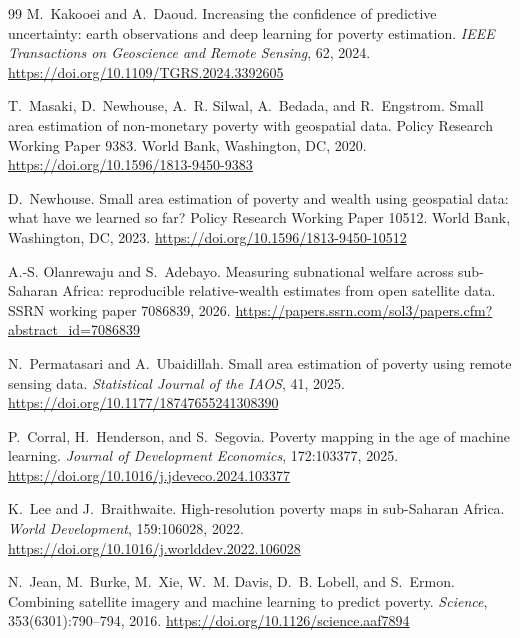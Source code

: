 \documentclass[11pt]{article}
\begin{document}
\begin{thebibliography}{99}
M.~Kakooei and A.~Daoud.
\newblock Increasing the confidence of predictive uncertainty: earth
observations and deep learning for poverty estimation.
\newblock \emph{IEEE Transactions on Geoscience and Remote Sensing}, 62, 2024.
\newblock \url{https://doi.org/10.1109/TGRS.2024.3392605}

T.~Masaki, D.~Newhouse, A.~R. Silwal, A.~Bedada, and R.~Engstrom.
\newblock Small area estimation of non-monetary poverty with geospatial data.
\newblock Policy Research Working Paper 9383. World Bank, Washington, DC, 2020.
\newblock \url{https://doi.org/10.1596/1813-9450-9383}

D.~Newhouse.
\newblock Small area estimation of poverty and wealth using geospatial data:
what have we learned so far?
\newblock Policy Research Working Paper 10512. World Bank, Washington, DC, 2023.
\newblock \url{https://doi.org/10.1596/1813-9450-10512}

A.-S. Olanrewaju and S.~Adebayo.
\newblock Measuring subnational welfare across sub-Saharan Africa: reproducible
relative-wealth estimates from open satellite data.
\newblock SSRN working paper 7086839, 2026.
\newblock \url{https://papers.ssrn.com/sol3/papers.cfm?abstract_id=7086839}

N.~Permatasari and A.~Ubaidillah.
\newblock Small area estimation of poverty using remote sensing data.
\newblock \emph{Statistical Journal of the IAOS}, 41, 2025.
\newblock \url{https://doi.org/10.1177/18747655241308390}

P.~Corral, H.~Henderson, and S.~Segovia.
\newblock Poverty mapping in the age of machine learning.
\newblock \emph{Journal of Development Economics}, 172:103377, 2025.
\newblock \url{https://doi.org/10.1016/j.jdeveco.2024.103377}

K.~Lee and J.~Braithwaite.
\newblock High-resolution poverty maps in sub-Saharan Africa.
\newblock \emph{World Development}, 159:106028, 2022.
\newblock \url{https://doi.org/10.1016/j.worlddev.2022.106028}

N.~Jean, M.~Burke, M.~Xie, W.~M. Davis, D.~B. Lobell, and S.~Ermon.
\newblock Combining satellite imagery and machine learning to predict poverty.
\newblock \emph{Science}, 353(6301):790--794, 2016.
\newblock \url{https://doi.org/10.1126/science.aaf7894}


\end{thebibliography}
\end{document}

